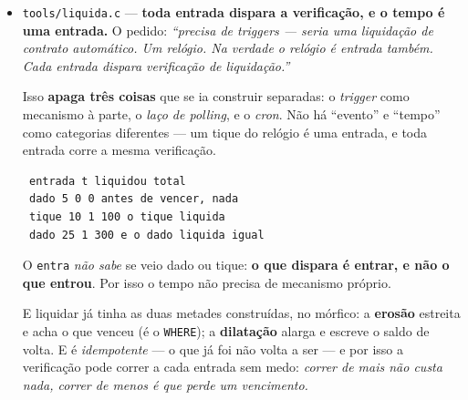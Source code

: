 \documentclass[11pt]{article}
\newcommand{\code}[1]{\texttt{\small #1}}
\theoremstyle{plain}
\theoremstyle{remark}
\begin{document}
\begin{itemize}
\begin{verbatim}
 pedido "ourives" -> respondido (banco 0)
 pedido "esmeralda" -> silêncio, e ninguém errou

 procurado um índice de quem-tem-o-quê: 0 encontrados
\end{verbatim}

\textbf{Não há quem decida onde um dado fica: ele diz onde fica ao ser o que é.} A cifra é o
endereço, e o endereço não se atribui --- \emph{lê-se}. Pedir também é emitir: quem tem responde e
quem não tem \textbf{cala-se} --- não há erro, não há nulo, não há exceção.

E a prova pela ausência: \emph{não há registo nenhum de quem tem o quê}. Por isso ninguém sabe
dizer onde um dado está --- não há quem saiba, porque não houve quem decidisse. Para o achar
percorre-se a cifra, que é \emph{a mesma operação de o guardar}, e não há uma segunda estrutura a
manter em dia. \textbf{Nenhum banco sabe da existência dos outros, e mesmo assim processam juntos.}

\item \code{tools/liquida.c} --- \textbf{toda entrada dispara a verificação, e o tempo é uma
entrada.} O pedido: \emph{``precisa de triggers --- seria uma liquidação de contrato automático. Um
relógio. Na verdade o relógio é entrada também. Cada entrada dispara verificação de liquidação.''}

Isso \textbf{apaga três coisas} que se ia construir separadas: o \emph{trigger} como mecanismo à
parte, o \emph{laço de polling}, e o \emph{cron}. Não há ``evento'' e ``tempo'' como categorias
diferentes --- um tique do relógio é uma entrada, e toda entrada corre a mesma verificação.

\begin{verbatim}
 entrada t liquidou total
 dado 5 0 0 antes de vencer, nada
 tique 10 1 100 o tique liquida
 dado 25 1 300 e o dado liquida igual
\end{verbatim}

O \code{entra} \emph{não sabe} se veio dado ou tique: \textbf{o que dispara é entrar, e não o que
entrou}. Por isso o tempo não precisa de mecanismo próprio.

E liquidar já tinha as duas metades construídas, no mórfico: a \textbf{erosão} estreita e acha o
que venceu (é o \code{WHERE}); a \textbf{dilatação} alarga e escreve o saldo de volta. E é
\emph{idempotente} --- o que já foi não volta a ser --- e por isso a verificação pode correr a cada
entrada sem medo: \emph{correr de mais não custa nada, correr de menos é que perde um vencimento.}


\end{itemize}
\end{document}
